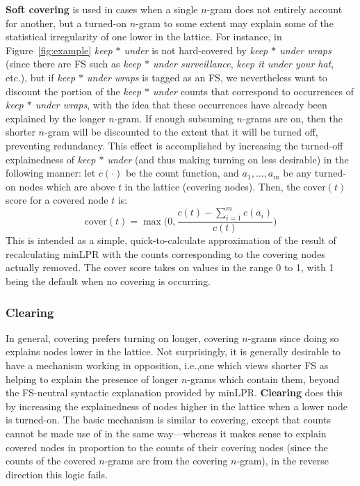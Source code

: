 \documentclass[11pt,letterpaper]{article}
\makeatletter
\def \ie {i.e.,\@ }
\def \etc {etc.\@ }
\newcommand{\dotts}{...}
\newcommand{\gap}{$*$\xspace}
\newcommand{\ex}[1]{\textit{#1}\xspace}
\newcommand{\termdef}[1]{\textbf{#1}\xspace}
\newcommand{\cover}{\ensuremath{\text{cover}}\xspace}
\newcommand{\figref}[2][]{Figure#1~\ref{#2}\xspace}
\makeatother
\begin{document}
\termdef{Soft covering} is used in cases when a single $n$-gram does not entirely account for another, but a turned-on $n$-gram to some extent may explain some of the statistical irregularity of one lower in the lattice. For instance, in \figref{fig:example} \ex{keep \gap under} is not hard-covered by \ex{keep \gap under wraps} (since there are FS such as \ex{keep \gap under surveillance}, \ex{keep it under your hat}, \etc), but if \ex{keep \gap under wraps} is tagged as an FS, we nevertheless want to discount the portion of the \ex{keep \gap under} counts that correspond to occurrences of \ex{keep \gap under wraps}, with the idea that these occurrences have already been explained by the longer $n$-gram. If enough subsuming $n$-grams are on, then the shorter $n$-gram will be discounted to the extent that it will be turned off, preventing redundancy. This effect is accomplished by increasing the turned-off explainedness of \ex{keep \gap under} (and thus making turning on less desirable) in the following manner: let $c(\cdot)$ be the count function, and $a_1,\dotts, a_m$ be any turned-on nodes which are above $t$ in the lattice (covering nodes). Then, the $\cover(t)$ score for a covered node $t$ is:
\begin{displaymath}
\cover(t) = \max\Big(0,\frac{c(t) - \sum_{i=1}^{m}{c(a_i)}}{c(t)}\Big)
\end{displaymath}
This is intended as a simple, quick-to-calculate approximation of the result of recalculating minLPR with the counts corresponding to the covering nodes actually removed. The \cover score takes on values in the range 0 to 1, with 1 being the default when no covering is occurring.

\subsubsection{Clearing}

In general, covering prefers turning on longer, covering $n$-grams since doing so explains nodes lower in the lattice. Not surprisingly, it is generally desirable to have a mechanism working in opposition, \ie one which views shorter FS as helping to explain the presence of longer $n$-grams which contain them, beyond the FS-neutral syntactic explanation provided by minLPR. \termdef{Clearing} does this by increasing the explainedness of nodes higher in the lattice when a lower node is turned-on. The basic mechanism is similar to covering, except that counts cannot be made use of in the same way---whereas it makes sense to explain covered nodes in proportion to the counts of their covering nodes (since the counts of the covered $n$-grams are from the covering $n$-gram), in the reverse direction this logic fails. 
\end{document}
